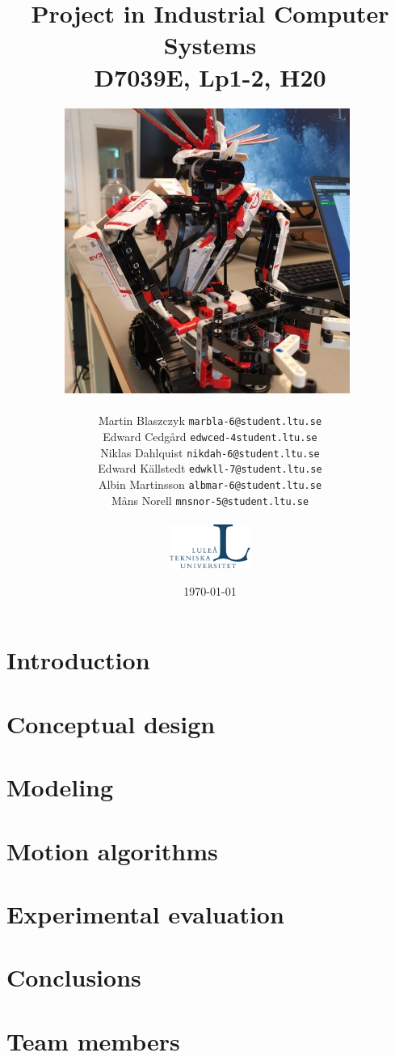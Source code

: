 \documentclass{report}
\title{Project in Industrial Computer Systems\\
D7039E, Lp1-2, H20}
\author{\includegraphics[width=0.7\textwidth]{img/robot.jpg}\ \\ \\
Martin Blaszczyk {\tt marbla-6@student.ltu.se}\\
Edward Cedgård {\tt edwced-4student.ltu.se}\\
Niklas Dahlquist {\tt nikdah-6@student.ltu.se}\\ 
Edward Källstedt {\tt edwkll-7@student.ltu.se}\\
Albin Martinsson {\tt albmar-6@student.ltu.se}\\
Måns Norell {\tt mnsnor-5@student.ltu.se}\\ \\
\includegraphics[width=0.2\textwidth]{img/ltu_swe.jpg}}
\date{\today}
\begin{document}
\maketitle
\begin{abstract}
\end{abstract}

\chapter*{Introduction}


\chapter*{Conceptual design}


\chapter*{Modeling}


\chapter*{Motion algorithms}


\chapter*{Experimental evaluation}


\chapter*{Conclusions}


\appendix
\chapter{Team members}

\end{document}
